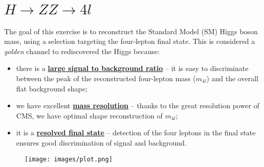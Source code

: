 \chapter{$H \rightarrow ZZ \rightarrow 4l$}
\justifying
\paragraph{}
The goal of this exercise is to reconstruct the Standard Model (SM) Higgs boson mass, using a selection targeting the four-lepton final state. This is considered a \textit{golden} channel to rediscovered the Higgs because:
\begin{itemize}
    \item there is a \textbf{\underline{ large signal to background ratio}} -- it is easy to discriminate between the peak of the reconstructed four-lepton mass ($m_{4l}$) and the overall flat background shape; 
    \item we have excellent \textbf{\underline{ mass resolution}} -- thanks to the great resolution power of CMS, we have optimal shape reconstruction of $m_{4l}$;
    \item it is a \textbf{\underline{ resolved final state}} -- detection of the four leptons in the final state ensures good discrimination of signal and background.
\end{itemize}

\begin{figure}[!h]
    \centering
    \texttt{[image: images/plot.png]}
    \caption{}
    \label{higgs_plot}
\end{figure}





